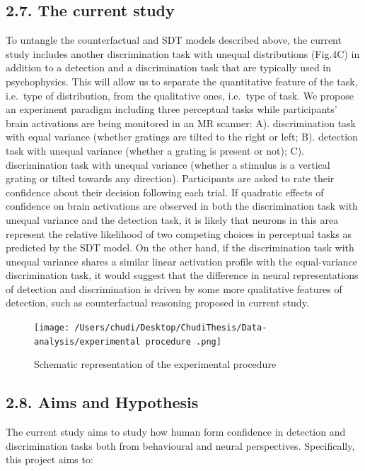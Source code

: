 \documentclass[
]{article}
\begin{document}
\hypertarget{the-current-study}{%
\subsection{2.7. The current study}\label{the-current-study}}

To untangle the counterfactual and SDT models described above, the
current study includes another discrimination task with unequal
distributions (Fig.4C) in addition to a detection and a discrimination
task that are typically used in psychophysics. This will allow us to
separate the quantitative feature of the task, i.e.~type of
distribution, from the qualitative ones, i.e.~type of task. We propose
an experiment paradigm including three perceptual tasks while
participants' brain activations are being monitored in an MR scanner:
A). discrimination task with equal variance (whether gratings are tilted
to the right or left; B). detection task with unequal variance (whether
a grating is present or not); C). discrimination task with unequal
variance (whether a stimulus is a vertical grating or tilted towards any
direction). Participants are asked to rate their confidence about their
decision following each trial. If quadratic effects of confidence on
brain activations are observed in both the discrimination task with
unequal variance and the detection task, it is likely that neurons in
this area represent the relative likelihood of two competing choices in
perceptual tasks as predicted by the SDT model. On the other hand, if
the discrimination task with unequal variance shares a similar linear
activation profile with the equal-variance discrimination task, it would
suggest that the difference in neural representations of detection and
discrimination is driven by some more qualitative features of detection,
such as counterfactual reasoning proposed in current study.

\begin{figure}
\centering
\texttt{[image: /Users/chudi/Desktop/ChudiThesis/Data-analysis/experimental procedure .png]}
\caption{Schematic representation of the experimental procedure}
\end{figure}

\hypertarget{aims-and-hypothesis}{%
\subsection{2.8. Aims and Hypothesis}\label{aims-and-hypothesis}}

The current study aims to study how human form confidence in detection
and discrimination tasks both from behavioural and neural perspectives.
Specifically, this project aims to:
\end{document}
